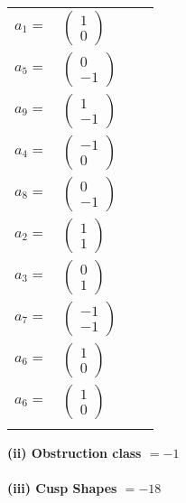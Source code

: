 \documentclass[1p]{elsarticle_modified}
\theoremstyle{definition}
\begin{document}
\begin{tabular}{m{7pt} m{180pt} m{7pt} m{180pt} }
\flushright $a_{1}=$&$\begin{pmatrix}1\\0\end{pmatrix}$ \\
\flushright $a_{5}=$&$\begin{pmatrix}0\\-1\end{pmatrix}$ \\
\flushright $a_{9}=$&$\begin{pmatrix}1\\-1\end{pmatrix}$ \\
\flushright $a_{4}=$&$\begin{pmatrix}-1\\0\end{pmatrix}$ \\
\flushright $a_{8}=$&$\begin{pmatrix}0\\-1\end{pmatrix}$ \\
\flushright $a_{2}=$&$\begin{pmatrix}1\\1\end{pmatrix}$ \\
\flushright $a_{3}=$&$\begin{pmatrix}0\\1\end{pmatrix}$ \\
\flushright $a_{7}=$&$\begin{pmatrix}-1\\-1\end{pmatrix}$ \\
\flushright $a_{6}=$&$\begin{pmatrix}1\\0\end{pmatrix}$\\ \flushright $a_{6}=$&$\begin{pmatrix}1\\0\end{pmatrix}$\\&\end{tabular}
\flushleft \textbf{(ii) Obstruction class $= -1$}\\~\\
\flushleft \textbf{(iii) Cusp Shapes $= -18$}\\~\\
\end{document}
